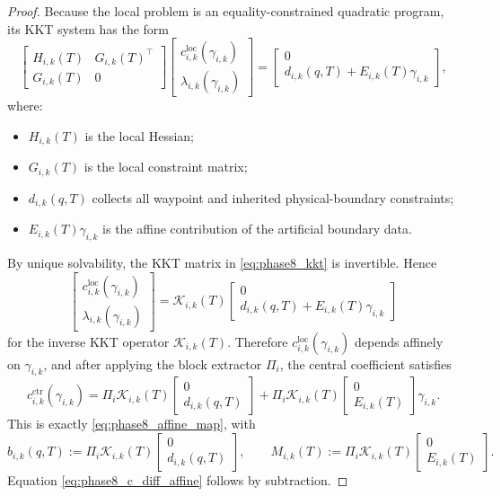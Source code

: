 \begin{proof}
Because the local problem is an equality-constrained quadratic program, its KKT system has the form
\begin{equation}
\label{eq:phase8_kkt}
\begin{bmatrix}
H_{i,k}(T) & G_{i,k}(T)^\top\\
G_{i,k}(T) & 0
\end{bmatrix}
\begin{bmatrix}
c^{\mathrm{loc}}_{i,k}(\gamma_{i,k})\\
\lambda_{i,k}(\gamma_{i,k})
\end{bmatrix}
=
\begin{bmatrix}
0\\
d_{i,k}(q,T)+E_{i,k}(T)\gamma_{i,k}
\end{bmatrix},
\end{equation}
where:
\begin{itemize}
    \item \(H_{i,k}(T)\) is the local Hessian;
    \item \(G_{i,k}(T)\) is the local constraint matrix;
    \item \(d_{i,k}(q,T)\) collects all waypoint and inherited physical-boundary constraints;
    \item \(E_{i,k}(T)\gamma_{i,k}\) is the affine contribution of the artificial boundary data.
\end{itemize}
By unique solvability, the KKT matrix in \eqref{eq:phase8_kkt} is invertible.
Hence
\[
\begin{bmatrix}
c^{\mathrm{loc}}_{i,k}(\gamma_{i,k})\\
\lambda_{i,k}(\gamma_{i,k})
\end{bmatrix}
=
\mathcal K_{i,k}(T)
\begin{bmatrix}
0\\
d_{i,k}(q,T)+E_{i,k}(T)\gamma_{i,k}
\end{bmatrix}
\]
for the inverse KKT operator \(\mathcal K_{i,k}(T)\).
Therefore \(c^{\mathrm{loc}}_{i,k}(\gamma_{i,k})\) depends affinely on \(\gamma_{i,k}\), and after applying the block extractor \(\Pi_i\), the central coefficient satisfies
\[
c_{i,k}^{\mathrm{ctr}}(\gamma_{i,k})
=
\Pi_i \mathcal K_{i,k}(T)
\begin{bmatrix}
0\\
d_{i,k}(q,T)
\end{bmatrix}
+
\Pi_i \mathcal K_{i,k}(T)
\begin{bmatrix}
0\\
E_{i,k}(T)
\end{bmatrix}
\gamma_{i,k}.
\]
This is exactly \eqref{eq:phase8_affine_map}, with
\[
b_{i,k}(q,T)
:=
\Pi_i \mathcal K_{i,k}(T)
\begin{bmatrix}
0\\
d_{i,k}(q,T)
\end{bmatrix},
\qquad
M_{i,k}(T)
:=
\Pi_i \mathcal K_{i,k}(T)
\begin{bmatrix}
0\\
E_{i,k}(T)
\end{bmatrix}.
\]
Equation \eqref{eq:phase8_c_diff_affine} follows by subtraction.
\end{proof}

